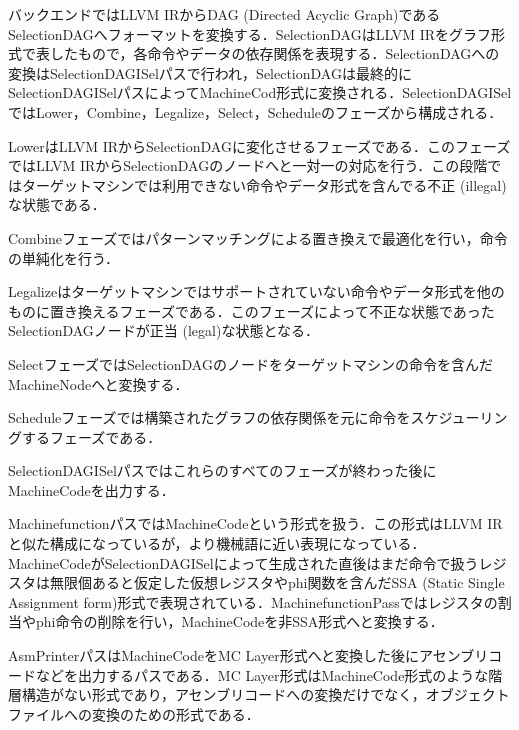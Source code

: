 バックエンドではLLVM IRからDAG (Directed Acyclic Graph)であるSelectionDAGへフォーマットを変換する．SelectionDAGはLLVM IRをグラフ形式で表したもので，各命令やデータの依存関係を表現する．SelectionDAGへの変換はSelectionDAGISelパスで行われ，SelectionDAGは最終的にSelectionDAGISelパスによってMachineCod形式に変換される．SelectionDAGISelではLower，Combine，Legalize，Select，Scheduleのフェーズから構成される．

LowerはLLVM IRからSelectionDAGに変化させるフェーズである．このフェーズではLLVM IRからSelectionDAGのノードへと一対一の対応を行う．この段階ではターゲットマシンでは利用できない命令やデータ形式を含んでる不正 (illegal)な状態である．

Combineフェーズではパターンマッチングによる置き換えで最適化を行い，命令の単純化を行う．

Legalizeはターゲットマシンではサポートされていない命令やデータ形式を他のものに置き換えるフェーズである．このフェーズによって不正な状態であったSelectionDAGノードが正当 (legal)な状態となる．

SelectフェーズではSelectionDAGのノードをターゲットマシンの命令を含んだMachineNodeへと変換する．

Scheduleフェーズでは構築されたグラフの依存関係を元に命令をスケジューリングするフェーズである．

SelectionDAGISelパスではこれらのすべてのフェーズが終わった後にMachineCodeを出力する．

MachinefunctionパスではMachineCodeという形式を扱う．この形式はLLVM IRと似た構成になっているが，より機械語に近い表現になっている．
MachineCodeがSelectionDAGISelによって生成された直後はまだ命令で扱うレジスタは無限個あると仮定した仮想レジスタやphi関数を含んだSSA (Static Single Assignment form)形式で表現されている．MachinefunctionPassではレジスタの割当やphi命令の削除を行い，MachineCodeを非SSA形式へと変換する．

AsmPrinterパスはMachineCodeをMC Layer形式へと変換した後にアセンブリコードなどを出力するパスである．MC Layer形式はMachineCode形式のような階層構造がない形式であり，アセンブリコードへの変換だけでなく，オブジェクトファイルへの変換のための形式である．


